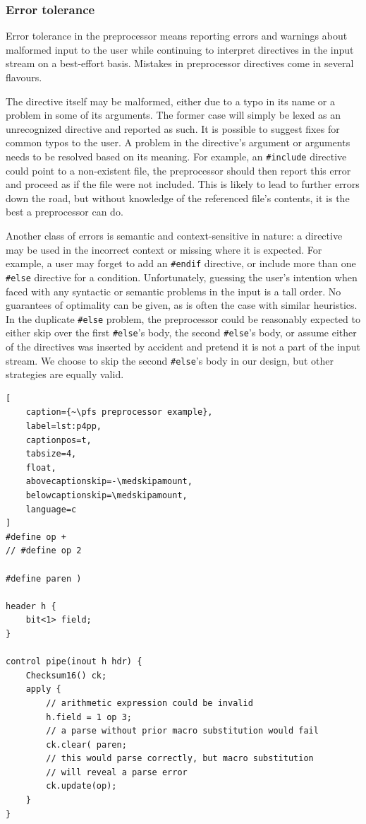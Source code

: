 \subsubsection*{Error tolerance}

Error tolerance in the preprocessor means reporting errors and warnings about
malformed input to the user while continuing to interpret directives in the
input stream on a best-effort basis. Mistakes in preprocessor directives come in
several flavours.

The directive itself may be malformed, either due to a typo in its name or a
problem in some of its arguments. The former case will simply be lexed as an
unrecognized directive and reported as such. It is possible to suggest fixes for
common typos to the user. A problem in the directive's argument or arguments
needs to be resolved based on its meaning. For example, an \texttt{\#include}
directive could point to a non-existent file, the preprocessor should then
report this error and proceed as if the file were not included. This is likely
to lead to further errors down the road, but without knowledge of the referenced
file's contents, it is the best a preprocessor can do.

Another class of errors is semantic and context-sensitive in nature: a directive
may be used in the incorrect context or missing where it is expected. For
example, a user may forget to add an \texttt{\#endif} directive, or include more
than one \texttt{\#else} directive for a condition. Unfortunately, guessing the
user's intention when faced with any syntactic or semantic problems in the input
is a tall order. No guarantees of optimality can be given, as is often the case
with similar heuristics. In the duplicate \texttt{\#else} problem, the
preprocessor could be reasonably expected to either skip over the first
\texttt{\#else}'s body, the second \texttt{\#else}'s body, or assume either of
the directives was inserted by accident and pretend it is not a part of the
input stream. We choose to skip the second \texttt{\#else}'s body in our design,
but other strategies are equally valid.

\begin{lstlisting}[
	caption={~\pfs preprocessor example},
	label=lst:p4pp,
	captionpos=t,
	tabsize=4,
	float,
	abovecaptionskip=-\medskipamount,
	belowcaptionskip=\medskipamount,
	language=c
]
#define op +
// #define op 2

#define paren )

header h {
	bit<1> field;
}

control pipe(inout h hdr) {
	Checksum16() ck;
	apply {
		// arithmetic expression could be invalid
		h.field = 1 op 3;
		// a parse without prior macro substitution would fail
		ck.clear( paren;
		// this would parse correctly, but macro substitution
		// will reveal a parse error
		ck.update(op);
	}
}
\end{lstlisting}


